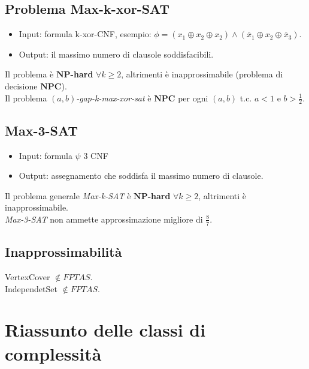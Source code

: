 \documentclass[a4paper]{article}
\theoremstyle{definition}
\newcommand{\np}{\mathbf{NP}}
\newcommand{\npc}{\mathbf{NPC}}
\begin{document}
		\subsection{Problema Max-k-xor-SAT}
			\begin{itemize}
				\item Input: formula k-xor-CNF, esempio: $ \phi = (x_1 \oplus x_2\oplus x_2) \wedge (\overline{x}_1 \oplus x_2 \oplus \overline{x}_3) $.
				\item Output: il massimo numero di clausole soddisfacibili.
			\end{itemize}
		
		\noindent
		Il problema è $\np$\textbf{-hard} $\forall k \geq 2$, altrimenti è inapprossimabile (problema di decisione $\npc$).\\
		Il problema $(a,b)$\textit{-gap-k-max-xor-sat} è $\npc$ per ogni $(a, b)$ t.c. $a<1$ e $b > \frac{1}{2}$.
		
		
		\subsection{Max-3-SAT}
		\begin{itemize}
			\item Input: formula $\psi$ 3 CNF
			\item Output: assegnamento che soddisfa il massimo numero di clausole.
		\end{itemize}
	
	\noindent
	Il problema generale \textit{Max-k-SAT} è $\np$\textbf{-hard} $\forall k \geq 2$, altrimenti è inapprossimabile.\\
	\textit{Max-3-SAT} non ammette approssimazione migliore di $\frac{8}{7}$.
	
		
		\subsection{Inapprossimabilità}
		VertexCover $\notin FPTAS$.\\
		IndependetSet $\notin FPTAS$.
		
	\section{Riassunto delle classi di complessità}
	
\end{document}
